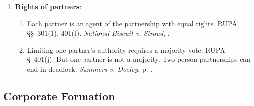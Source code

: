 \begin{enumerate}
    \item \textbf{Rights of partners}:
    \begin{enumerate}
        \item Each partner is an agent of the partnership with equal rights. 
        RUPA \S\S\ 301(1), 401(f). \emph{National Biscuit v. Stroud}, \pageref{par:biscuit}.
        \item Limiting one partner's authority requires a majority vote. RUPA 
        \S\ 401(j). But one partner is not a majority. Two-person partnerships 
        can end in deadlock. \emph{Summers v. Dooley}, p. 
        \pageref{par:summers}.
    \end{enumerate}
\end{enumerate}

\newpage

\subsection{Corporate Formation}

